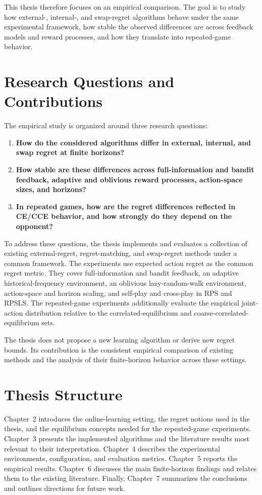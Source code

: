 This thesis therefore focuses on an empirical comparison. The goal is to study
how external-, internal-, and swap-regret algorithms behave under the same
experimental framework, how stable the observed differences are across
feedback models and reward processes, and how they translate into repeated-game
behavior.

\section{Research Questions and Contributions}

The empirical study is organized around three research questions:

\begin{enumerate}
    \item \textbf{How do the considered algorithms differ in external,
    internal, and swap regret at finite horizons?}

    \item \textbf{How stable are these differences across full-information and
    bandit feedback, adaptive and oblivious reward processes, action-space
    sizes, and horizons?}

    \item \textbf{In repeated games, how are the regret differences reflected
    in CE/CCE behavior, and how strongly do they depend on the opponent?}
\end{enumerate}

To address these questions, the thesis implements and evaluates a collection of
existing external-regret, regret-matching, and swap-regret methods under a
common framework. The experiments use expected action regret as the common
regret metric. They cover full-information and bandit feedback, an adaptive
historical-frequency environment, an oblivious lazy-random-walk environment,
action-space and horizon scaling, and self-play and cross-play in RPS and
RPSLS. The repeated-game experiments additionally evaluate the empirical
joint-action distribution relative to the correlated-equilibrium and
coarse-correlated-equilibrium sets.

The thesis does not propose a new learning algorithm or derive new regret
bounds. Its contribution is the consistent empirical comparison of existing
methods and the analysis of their finite-horizon behavior across these
settings.

\section{Thesis Structure}

Chapter~2 introduces the online-learning setting, the regret notions used in
the thesis, and the equilibrium concepts needed for the repeated-game
experiments. Chapter~3 presents the implemented algorithms and the literature
results most relevant to their interpretation. Chapter~4 describes the
experimental environments, configuration, and evaluation metrics.
Chapter~5 reports the empirical results. Chapter~6 discusses the main
finite-horizon findings and relates them to the existing literature. Finally,
Chapter~7 summarizes the conclusions and outlines directions for future work.
